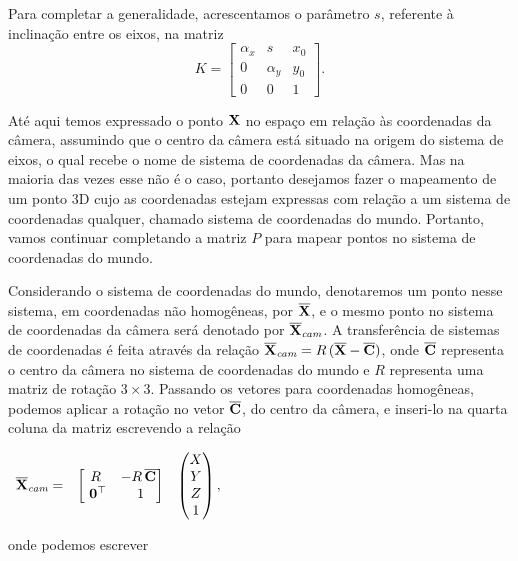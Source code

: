 Para completar a generalidade, acrescentamos o parâmetro $s$, referente à inclinação entre os eixos, na matriz
\begin{equation*}
K=
\begin{bmatrix}
\alpha_x&s&x_0\\
0&\alpha_y&y_0\\
0&0&1
\end{bmatrix}.
\end{equation*}






Até aqui temos expressado o ponto $\mathbf{X}$ no espaço em relação às coordenadas da câmera, assumindo que o centro da câmera está situado na origem do sistema de eixos, o qual recebe o nome de sistema de coordenadas da câmera. Mas na maioria das vezes esse não é o caso, portanto desejamos fazer o mapeamento de um ponto 3D cujo as coordenadas estejam expressas com relação a um sistema de coordenadas qualquer, chamado sistema de coordenadas do mundo. Portanto, vamos continuar completando a matriz $P$ para mapear pontos no sistema de coordenadas do mundo.

Considerando o sistema de coordenadas do mundo, denotaremos um ponto nesse sistema, em coordenadas não homogêneas, por $\overline{\mathbf{X}}$, e o mesmo ponto no sistema de coordenadas da câmera será denotado por $\overline{\mathbf{X}}_{\textit{cam}}$. A transferência de sistemas de coordenadas é feita através da relação $\overline{\mathbf{X}}_{\textit{cam}}=R\,(\overline{\mathbf{X}}-\overline{\bf C})$, onde $\overline{\bf C}$ representa o centro da câmera no sistema de coordenadas do mundo e $R$ representa uma matriz de rotação $3\times3$. Passando os vetores para coordenadas homogêneas, podemos aplicar a rotação no vetor $\overline{\bf C}$, do centro da câmera, e inseri-lo na quarta coluna da matriz escrevendo a relação

\begin{center}
$
\begin{array}{ccc}
\overline{\mathbf{X}}_{\textit{cam}}=
&
\begin{bmatrix}
R&-R\,\overline{\bf C}\\
\,\,{\bf 0}^\top&\,\,1
\end{bmatrix}
&
\begin{pmatrix}
X\\
Y\\
Z\\
1
\end{pmatrix},
\end{array}
$
\end{center} 
onde podemos escrever

